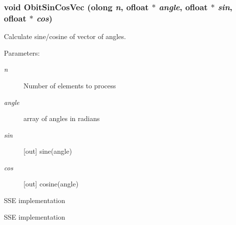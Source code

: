 \subsubsection{\setlength{\rightskip}{0pt plus 5cm}void Obit\-Sin\-Cos\-Vec ({\bf olong} {\em n}, {\bf ofloat} $\ast$ {\em angle}, {\bf ofloat} $\ast$ {\em sin}, {\bf ofloat} $\ast$ {\em cos})}\label{ObitSinCos_8h_a1}


Calculate sine/cosine of vector of angles. 

\begin{Desc}
\item[Parameters:]
\begin{description}
\item[{\em n}]Number of elements to process \item[{\em angle}]array of angles in radians \item[{\em sin}][out] sine(angle) \item[{\em cos}][out] cosine(angle)\end{description}
\end{Desc}


SSE implementation 

SSE implementation 